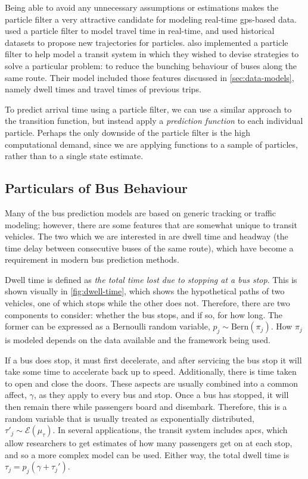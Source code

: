 \documentclass[12pt,a4paper]{article}
\newcommand{\pf}{particle filter}
\begin{document}
Being able to avoid any unnecessary assumptions or estimations makes the
\pf{} a very attractive candidate for modeling real-time \gls{gps}-based data.
\cite{chen-rakha:2014} used a \pf{} to model travel time in real-time,
and used historical datasets to propose new trajectories for particles.
\cite{hans-etal:2015} also implemented a \pf{} to help model a transit system
in which they wished to devise strategies to solve a particular problem:
to reduce the bunching behaviour of buses along the same route.
Their model included those features discussed in \cref{sec:data-models},
namely dwell times and travel times of previous trips.


To predict arrival time using a \pf{}, we can use a similar approach to the transition
function, but instead apply a \emph{prediction function} to each individual particle.
Perhaps the only downside of the \pf{} is the high computational demand,
since we are applying functions to a sample of particles, rather than to
a single state estimate.



\subsection{Particulars of Bus Behaviour}
\label{sec:bus-behaviour}

Many of the bus prediction models are based on generic tracking or traffic modeling;
however, there are some features that are somewhat unique to transit vehicles.
The two which we are interested in are dwell time and headway 
(the time delay between consecutive buses of the same route),
which have become a requirement in modern bus prediction methods.


Dwell time is defined as \emph{the total time lost due to stopping at a bus stop}.
This is shown visually in \cref{fig:dwell-time},
which shows the hypothetical paths of two vehicles, one of which stops while the other does not.
Therefore, there are two components to consider:
whether the bus stops, and if so, for how long.
The former can be expressed as a Bernoulli random variable, $p_j \sim \mathrm{Bern}(\pi_j)$.
How $\pi_j$ is modeled depends on the data available and the framework being used.


If a bus does stop, it must first decelerate, 
and after servicing the bus stop it will take some time to accelerate back up to speed.
Additionally, there is time taken to open and close the doors.
These aspects are usually combined into a common affect, $\gamma$,
as they apply to every bus and stop.
Once a bus has stopped, it will then remain there while passengers board and disembark.
Therefore, this is a random variable that is usually treated as exponentially distributed,
$\tau'_j \sim \mathcal{E}(\mu_\tau)$.
In several applications, the transit system includes \glspl{apc},  
which allow researchers to get estimates of how many passengers get on at each stop,
and so a more complex model can be used.
Either way, the total dwell time is $\tau_j = p_j(\gamma + \tau_j')$.
\end{document}
